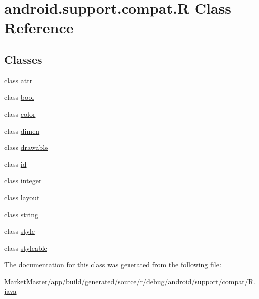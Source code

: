 \hypertarget{classandroid_1_1support_1_1compat_1_1R}{}\section{android.\+support.\+compat.\+R Class Reference}
\label{classandroid_1_1support_1_1compat_1_1R}
\subsection*{Classes}
\begin{DoxyCompactItemize}
\item 
class \mbox{\hyperlink{classandroid_1_1support_1_1compat_1_1R_1_1attr}{attr}}
\item 
class \mbox{\hyperlink{classandroid_1_1support_1_1compat_1_1R_1_1bool}{bool}}
\item 
class \mbox{\hyperlink{classandroid_1_1support_1_1compat_1_1R_1_1color}{color}}
\item 
class \mbox{\hyperlink{classandroid_1_1support_1_1compat_1_1R_1_1dimen}{dimen}}
\item 
class \mbox{\hyperlink{classandroid_1_1support_1_1compat_1_1R_1_1drawable}{drawable}}
\item 
class \mbox{\hyperlink{classandroid_1_1support_1_1compat_1_1R_1_1id}{id}}
\item 
class \mbox{\hyperlink{classandroid_1_1support_1_1compat_1_1R_1_1integer}{integer}}
\item 
class \mbox{\hyperlink{classandroid_1_1support_1_1compat_1_1R_1_1layout}{layout}}
\item 
class \mbox{\hyperlink{classandroid_1_1support_1_1compat_1_1R_1_1string}{string}}
\item 
class \mbox{\hyperlink{classandroid_1_1support_1_1compat_1_1R_1_1style}{style}}
\item 
class \mbox{\hyperlink{classandroid_1_1support_1_1compat_1_1R_1_1styleable}{styleable}}
\end{DoxyCompactItemize}


The documentation for this class was generated from the following file\+:\begin{DoxyCompactItemize}
\item 
Market\+Master/app/build/generated/source/r/debug/android/support/compat/\mbox{\hyperlink{debug_2android_2support_2compat_2R_8java}{R.\+java}}\end{DoxyCompactItemize}
